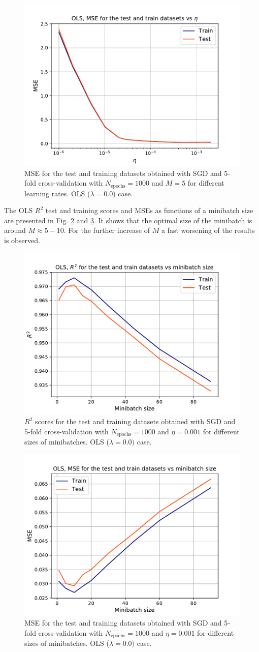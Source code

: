 \documentclass{emulateapj}
\begin{document}
\begin{figure}[!htb]
    \centering
    \includegraphics[width=.49\textwidth]{Figures/OLS_MSE_eta.pdf}
    \caption{MSE for the test and training datasets obtained with SGD and 5-fold cross-validation with $N_{\mathrm{epochs}}=1000$ and $M=5$ for different learning rates. OLS ($\lambda=0.0)$ case.}
    \label{fig: MSE_OLS_eta}
\end{figure}

The OLS $R^{2}$ test and training scores and MSEs as functions of a minibatch size are presented in Fig. \ref{fig: R2_OLS_minibatch} and \ref{fig: MSE_OLS_minibatch}. It shows that the optimal size of the minibatch is around $M\approx5-10$. For the further increase of $M$ a fast worsening of the results is observed. 

\begin{figure}[!htb]
    \centering
    \includegraphics[width=.49\textwidth]{Figures/OLS_R2_minibatch.pdf}
    \caption{$R^2$ scores for the test and training datasets obtained with SGD and 5-fold cross-validation with $N_{\mathrm{epochs}}=1000$ and $\eta=0.001$ for different sizes of minibatches. OLS ($\lambda=0.0)$ case.}
    \label{fig: R2_OLS_minibatch}
\end{figure}

\begin{figure}[!htb]
    \centering
    \includegraphics[width=.49\textwidth]{Figures/OLS_MSE_minibatch.pdf}
    \caption{MSE for the test and training datasets obtained with SGD and 5-fold cross-validation with $N_{\mathrm{epochs}}=1000$ and $\eta=0.001$ for different sizes of minibatches. OLS ($\lambda=0.0)$ case.}
    \label{fig: MSE_OLS_minibatch}
\end{figure}
\end{document}
